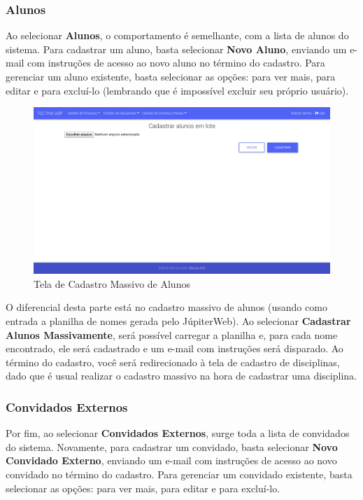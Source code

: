 \subsubsection{Alunos}
Ao selecionar \textbf{Alunos}, o comportamento é semelhante, com a lista de alunos do sistema. Para cadastrar um aluno, basta selecionar \textbf{Novo Aluno}, enviando um e-mail com instruções de acesso ao novo aluno no término do cadastro. Para gerenciar um aluno existente, basta selecionar as opções: \faEye para ver mais, \faEdit para editar e \faTrash para excluí-lo (lembrando que é impossível excluir seu próprio usuário).

\begin{figure}[H]
    \centering
    \includegraphics[scale=0.3]{imagens/tela_cadastro_massivo.png}
    \caption{Tela de Cadastro Massivo de Alunos}
    \label{fig:massive-sign-up}
\end{figure}

O diferencial desta parte está no cadastro massivo de alunos (usando como entrada a planilha de nomes gerada pelo JúpiterWeb). Ao selecionar \textbf{Cadastrar Alunos Massivamente}, será possível carregar a planilha e, para cada nome encontrado, ele será cadastrado e um e-mail com instruções será disparado. Ao término do cadastro, você será redirecionado à tela de cadastro de disciplinas, dado que é usual realizar o cadastro massivo na hora de cadastrar uma disciplina.

\subsubsection{Convidados Externos}
Por fim, ao selecionar \textbf{Convidados Externos}, surge toda a lista de convidados do sistema. Novamente, para cadastrar um convidado, basta selecionar \textbf{Novo Convidado Externo}, enviando um e-mail com instruções de acesso ao novo convidado no término do cadastro. Para gerenciar um convidado existente, basta selecionar as opções: \faEye para ver mais, \faEdit para editar e \faTrash para excluí-lo.


